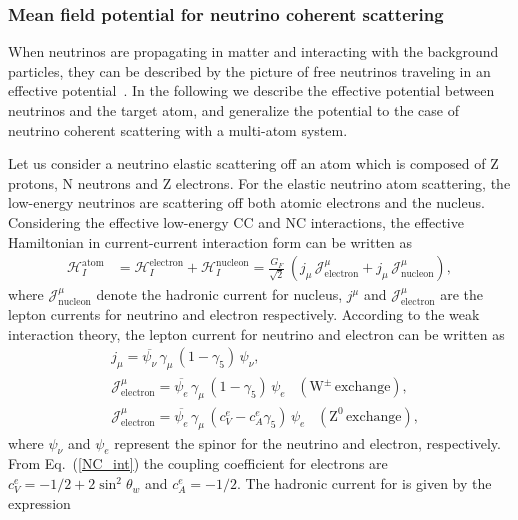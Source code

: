 \subsubsection{Mean field potential for neutrino coherent scattering}
When neutrinos are propagating in matter and interacting with the background particles, they can be described by the picture of free neutrinos traveling in an effective potential~\cite{Wolfenstein:1977ue}. In the following we describe the effective potential between neutrinos and the target atom, and generalize the potential to the case of neutrino coherent scattering with a multi-atom system.


Let us consider a neutrino elastic scattering off an atom which is composed of Z protons, N neutrons and Z electrons. For the elastic neutrino atom scattering, the low-energy neutrinos are scattering off both atomic electrons and the nucleus. Considering the effective low-energy CC and NC interactions, the effective Hamiltonian in current-current interaction form can be written as 
\begin{align}
\label{H_atom}
\mathcal{H}_I^{\mathrm{atom}}&=\mathcal{H}^\mathrm{electron}_I+\mathcal{H}^\mathrm{nucleon}_I=\frac{G_F}{\sqrt{2}}\,\left(j_\mu\,\mathcal{J}^\mu_{\mathrm{electron}}+j_\mu\,\mathcal{J}^\mu_\mathrm{nucleon}\right),
\end{align}
where $\mathcal{J}^\mu_{\mathrm{nucleon}}$ denote the hadronic current for nucleus, $j^\mu$ and $\mathcal{J}^\mu_{\mathrm{electron}}$ are the lepton currents for neutrino and electron respectively. According to the weak interaction theory, the lepton current for neutrino and  electron can be written as
\begin{align}
&j_\mu=\overline{\psi_{\nu}}\,\gamma_\mu\,\left(1-\gamma_5\right)\,\psi_\nu,\\
\label{Current_e}
&\mathcal{J}^\mu_{\mathrm{electron}}=\overline{\psi_{e}}\,\gamma_\mu\,\left(1-\gamma_5\right)\,\psi_e\,\,\,\,\,(\mathrm{W^\pm\,exchange}),\\
&\mathcal{J}^\mu_{\mathrm{electron}}=\overline{\psi_{e}}\,\gamma_\mu\,\left(c_V^e-c_A^e\gamma_5\right)\,\psi_e\,\,\,\,\,(\mathrm{Z^0\,exchange}),
\end{align}
where  $\psi_\nu$ and $\psi_e$ represent the spinor for the neutrino and electron, respectively. From Eq.~(\ref{NC_int}) the coupling coefficient for electrons are $c^e_V=-1/2+2\sin^2\theta_w$ and $c^e_A=-1/2$. The hadronic current for is given by the expression~\cite{Giunti:2007ry}
